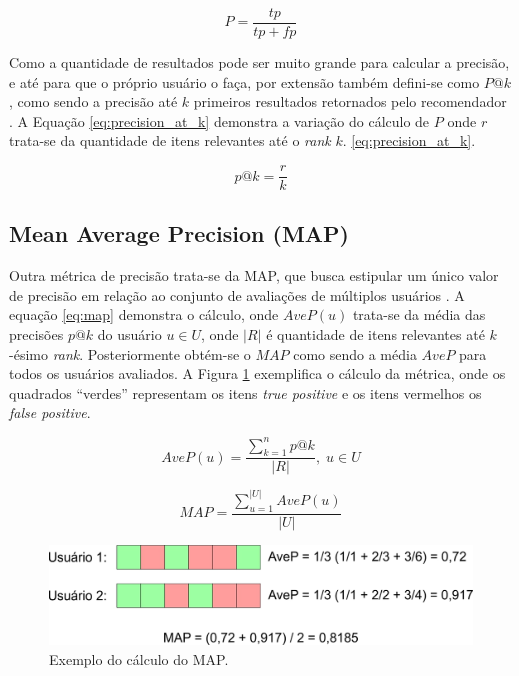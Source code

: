 \begin{equation}
	P = \frac{tp}{tp + fp}
\label{eq:precision}
\end{equation}

Como a quantidade de resultados pode ser muito grande para calcular a precisão, e até para que o próprio usuário o faça, por extensão também defini-se como $P@k$, como sendo a precisão até $k$ primeiros resultados retornados pelo recomendador \citep{Aggarwal2016:Evaluation}. A Equação \ref{eq:precision_at_k} demonstra a variação do cálculo de $P$ onde $r$ trata-se da quantidade de itens relevantes até o \textit{rank} $k$. \ref{eq:precision_at_k}.

\begin{equation}
	p@k = \frac{r}{k}
\label{eq:precision_at_k}
\end{equation}

\subsection{Mean Average Precision (MAP)}

Outra métrica de precisão trata-se da \ac{MAP}, que busca estipular um único valor de precisão em relação ao conjunto de avaliações de múltiplos usuários \citep{Manning:2008}. A equação \ref{eq:map} demonstra o cálculo, onde $AveP(u)$ trata-se da média das precisões $p@k$ do usuário $u \in U$, onde $|R|$ é quantidade de itens relevantes até $k$-ésimo \textit{rank}. Posteriormente obtém-se o $MAP$ como sendo a média $AveP$ para todos os usuários avaliados. A Figura \ref{fig:map_ex} exemplifica o cálculo da métrica, onde os quadrados \enquote{verdes} representam os itens \textit{true positive} e os itens vermelhos os \textit{false positive}.

\begin{equation}
	AveP(u) = \frac{\sum_{k=1}^{n} p@k}{|R|}, \; u \in U
\label{eq:avep}
\end{equation}

\begin{equation}
	MAP = \frac{\sum_{u=1}^{|U|}AveP(u)}{|U|}
\label{eq:map}
\end{equation}

\begin{figure}
	\centering
	\includegraphics[scale=0.4]{imagens/map_ex.jpg}
	\caption{Exemplo do cálculo do MAP.}
	\label{fig:map_ex}
\end{figure}

